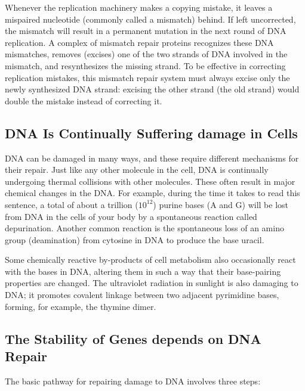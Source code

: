 Whenever the replication machinery makes a copying mistake, it leaves
a mispaired nucleotide (commonly called a mismatch) behind. If left
uncorrected, the mismatch will result in a permanent mutation in the
next round of DNA replication. A complex of mismatch
repair proteins recognizes these DNA mismatches, removes (excises) one
of the two strands of DNA involved in the mismatch, and resynthesizes
the missing strand. To be effective in correcting replication
mistakes, this mismatch repair system must always excise only the newly
synthesized DNA strand: excising the other strand (the old strand) would
double the mistake instead of correcting it.

\subsection{DNA Is Continually Suffering damage in Cells}
DNA can be damaged in many ways, and these require different mechanisms for their repair. Just
like any other molecule in the cell, DNA is continually undergoing thermal collisions with other molecules. These often result in major chemical
changes in the DNA. For example, during the time it takes to read this
sentence, a total of about a trillion ($10^12$) purine bases (A and G) will be
lost from DNA in the cells of your body by a spontaneous reaction called
depurination.
Another common reaction is the spontaneous loss of an amino
group (deamination) from cytosine in DNA to produce the base uracil.

Some chemically reactive by-products of cell metabolism
also occasionally react with the bases in DNA, altering them in such a
way that their base-pairing properties are changed. The ultraviolet radiation
in sunlight is also damaging to DNA; it promotes covalent linkage
between two adjacent pyrimidine bases, forming, for example, the thymine dimer.

\subsection{The Stability of Genes depends on DNA Repair}

The basic pathway for repairing damage to DNA involves three steps:

